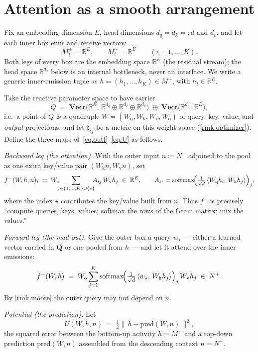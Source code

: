 \documentclass[11pt]{article}
\theoremstyle{plain}
\theoremstyle{definition}
\theoremstyle{remark}
\newcommand{\rr}{\mathbb{R}}
\newcommand{\Cat}[1]{\mathbf{#1}}
\newcommand{\vect}{\Cat{Vect}}
\newcommand{\rv}[1]{\mathbf{#1}}         %
\newcommand{\sharpR}{\sharp}
\newcommand{\inpt}[1]{#1^{-}}
\newcommand{\outp}[1]{#1^{+}}
\DeclareMathOperator{\softmax}{softmax}
\newcommand{\Wq}{W_{\mathrm q}}
\newcommand{\Wk}{W_{\mathrm k}}
\newcommand{\Wv}{W_{\mathrm v}}
\newcommand{\Wo}{W_{\mathrm o}}
\begin{document}
\section{Attention as a smooth arrangement}\label{sec.attention}

Fix an embedding dimension $E$, head dimensions $d_q=d_k=:d$ and
$d_v$, and let each inner box emit and receive vectors:
\[
  \outp{M_i}=\rr^{E},\qquad \inpt{M_i}=\rr^{E}\qquad(i=1,\dots,K).
\]
Both legs of every box are the embedding space $\rr^{E}$ (the residual
stream); the head space $\rr^{d_v}$ below is an internal bottleneck, never
an interface. We write a generic inner-emission tuple as
$h=(h_1,\dots,h_K)\in\outp M$, with $h_i\in\rr^{E}$.

\begin{construction}\label{con.head}
Take the reactive parameter space to have carrier
\[
  Q\;=\;\vect\!\bigl(\rr^{E},\,\rr^{d_q}\oplus\rr^{d_k}\oplus\rr^{d_v}\bigr)
        \;\oplus\;\vect\!\bigl(\rr^{d_v},\,\rr^{E}\bigr),
\]
i.e.\ a point of $Q$ is a quadruple $W=(\Wq,\Wk,\Wv,\Wo)$ of query, key,
value, and \emph{output} projections, and let $\sharpR_Q$ be a metric on
this weight space (\cref{rmk.optimizer}). Define the three maps
of~\eqref{eq.outf}--\eqref{eq.U} as follows.

\emph{Backward leg (the attention).} With the outer input
$n\coloneqq\inpt N$ adjoined to the pool as one extra key/value pair
$(\Wk n,\Wv n)$, set
\begin{equation}\label{eq.attn}
  \inpt f(W,h,n)_i
   \;=\;\Wo\!\!\!\sum_{j\in\{1,\dots,K\}\cup\{\star\}}\!\!\! A_{ij}\,\Wv h_j
   \;\in\;\rr^{E},
  \qquad
  A_{i\,\cdot}=\softmax\!\Bigl(\tfrac{1}{\sqrt d}\,\langle \Wq h_i,\,\Wk h_j\rangle\Bigr)_{j},
\end{equation}
where the index $\star$ contributes the key/value built from $n$. Thus
$\inpt f$ is precisely ``compute queries, keys, values; softmax the rows
of the Gram matrix; mix the values.''

\emph{Forward leg (the read-out).} Give the outer box a query $w_\star$ ---
either a learned vector carried in $\rv Q$ or one pooled from $h$ --- and
let it attend over the inner emissions:
\begin{equation}\label{eq.pool}
  \outp f(W,h)
   \;=\;\Wo\sum_{j=1}^{K}\softmax\!\Bigl(\tfrac{1}{\sqrt d}\,\langle w_\star,\,\Wk h_j\rangle\Bigr)_j\,\Wv h_j
   \;\in\;\outp N .
\end{equation}
By \cref{rmk.moore} the outer query may not depend on $n$.

\emph{Potential (the prediction).} Let
\begin{equation}\label{eq.Uattn}
  U(W,h,n)\;=\;\tfrac12\bigl\lVert\,h-\mathrm{pred}(W,n)\,\bigr\rVert^{2},
\end{equation}
the squared error between the bottom-up activity $h=\outp M$ and a
top-down prediction $\mathrm{pred}(W,n)$ assembled from the descending
context $n=\inpt N$.\qedhere
\end{construction}
\end{document}
